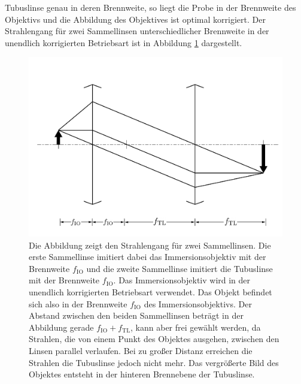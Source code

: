 \documentclass[titlepage,  ngerman]{article}
\begin{document}
Tubuslinse genau in deren Brennweite, so liegt die Probe in der Brennweite des Objektivs und die Abbildung des Objektives ist optimal korrigiert.\cite{Kuhl.2018} Der Strahlengang für zwei Sammellinsen unterschiedlicher Brennweite in der unendlich korrigierten Betriebsart ist in Abbildung \ref{fig:bildentstehungobjektiv} dargestellt.
	\begin{figure}[h]
		\centering
		\includegraphics[width=0.7\linewidth]{figures/BildentstehungObjektiv.pdf}
		\caption[Strahlengang eines unendlich korrigierten Objektivs]{Die Abbildung zeigt den Strahlengang für zwei Sammellinsen. Die erste Sammellinse imitiert dabei das Immersionsobjektiv mit der Brennweite $f_\mathrm{IO}$ und die zweite Sammellinse imitiert die Tubuslinse mit der Brennweite $f_\mathrm{IO}$. Das Immersionsobjektiv wird in der unendlich korrigierten Betriebsart verwendet. Das Objekt befindet sich also in der Brennweite $f_\mathrm{IO}$ des Immersionsobjektivs. Der Abstand zwischen den beiden Sammellinsen beträgt in der Abbildung gerade $f_\mathrm{IO} + f_\mathrm{TL}$, kann aber frei gewählt werden, da Strahlen, die von einem Punkt des Objektes ausgehen, zwischen den Linsen parallel verlaufen. Bei zu großer Distanz erreichen die Strahlen die Tubuslinse jedoch nicht mehr. Das vergrößerte Bild des Objektes entsteht in der hinteren Brennebene der Tubuslinse.}
		\label{fig:bildentstehungobjektiv}
	\end{figure}
	
\end{document}
